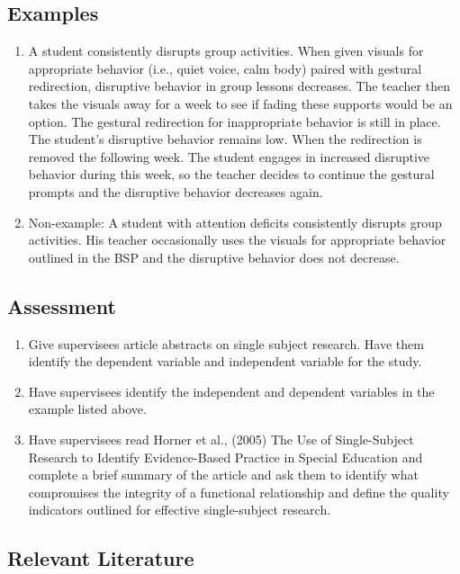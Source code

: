 \subsection{Examples} 
\begin{enumerate}
\item   A student consistently disrupts group activities. When given visuals for appropriate behavior (i.e., quiet voice, calm body) paired with gestural redirection, disruptive behavior in group lessons decreases. The teacher then takes the visuals away for a week to see if fading these supports would be an option. The gestural redirection for inappropriate behavior is still in place. The student's disruptive behavior remains low. When the redirection is removed the following week. The student engages in increased disruptive behavior during this week, so the teacher decides to continue the gestural prompts and the disruptive behavior decreases again. 
\item Non-example: A student with attention deficits consistently disrupts group activities. His teacher occasionally uses the visuals for appropriate behavior outlined in the BSP and the disruptive behavior does not decrease.
\end{enumerate}

\subsection{Assessment}
\begin{enumerate}
\item Give supervisees article abstracts on single subject research. Have them identify the dependent variable and independent variable for the study.
\item Have supervisees identify the independent and dependent variables in the example listed above.
\item Have supervisees read Horner et al., (2005) The Use of Single-Subject Research to Identify Evidence-Based Practice in Special Education and complete a brief summary of the article and ask them to identify what compromises the integrity of a functional relationship and define the quality indicators outlined for effective single-subject research.
\end{enumerate}
%
\subsection{Relevant Literature} 
\begin{refsection}
\nocite{test,alang2017police,clayton2018black}
\printbibliography[heading=none]
\end{refsection}%

